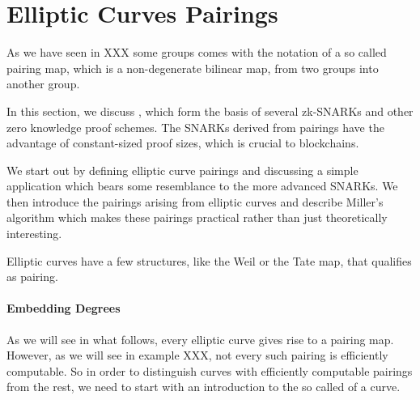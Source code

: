 
\section{Elliptic Curves Pairings} As we have seen in XXX some groups comes with the notation of a so called pairing map, which is a non-degenerate bilinear map, from two groups into another group.

In this section, we discuss , which form the basis of several zk-SNARKs and other zero knowledge proof schemes. The SNARKs derived from pairings have the advantage of constant-sized proof sizes, which is crucial to blockchains. 

We start out by defining elliptic curve pairings and discussing a simple application which bears some resemblance to the more advanced SNARKs. We then introduce the pairings arising from elliptic curves and describe Miller's algorithm which makes these pairings practical rather than just theoretically interesting.

Elliptic curves have a few structures, like the Weil or the Tate map, that qualifies as pairing.   

\paragraph{Embedding Degrees}As we will see in what follows, every elliptic curve gives rise to a pairing map. However, as we will see in example XXX, not every such pairing is efficiently computable. So in order to distinguish curves with efficiently computable pairings from the rest, we need to start with an introduction to the so called  of a curve. 

